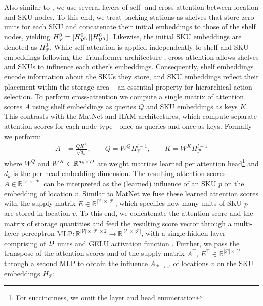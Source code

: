 Also similar to \cite{luttmann2024neural}, we use several layers of self- and cross-attention between location and SKU nodes. To this end, we treat packing stations as shelves that store zero units for each SKU and concatenate their initial embeddings to those of the shelf nodes, yielding $H^{0}_\mathcal{V} = [H^{0}_{\mathcal{V}^{\text{D}}} || H^{0}_{\mathcal{V}^{\text{R}}}]$. Likewise, the initial SKU embeddings are denoted as $H^{0}_\mathcal{P}$. While self-attention is applied independently to shelf and SKU embeddings following the Transformer architecture \cite{vaswaniAttentionAllYou2017a}, cross-attention allows shelves and SKUs to influence each other’s embeddings. Consequently, shelf embeddings encode information about the SKUs they store, and SKU embeddings reflect their placement within the storage area -- an essential property for hierarchical action selection. To perform cross-attention we compute a single matrix of attention scores $A$ using shelf embeddings as queries $Q$ and SKU embeddings as keys $K$. This contrasts with the MatNet \cite{kwonMatrixEncodingNetworks2021a} and HAM \cite{luttmann2024neural} architectures, which compute separate attention scores for each node type—once as queries and once as keys. Formally we perform:
\begin{align}
    \label{eq:matnet_dot_score}
    A &= \frac{QK^\top}{\sqrt{d_k}}, \qquad Q = W^Q H_{\mathcal{V}}^{l-1}, \qquad  K = W^K H_{\mathcal{P}}^{l-1}
\end{align}
where $W^Q$ and $W^K \in \mathbb{R}^{d_k \times {D}}$ are weight matrices learned per attention head\footnote{For succinctness, we omit the layer and head enumeration} and $d_k$ is the per-head embedding dimension. The resulting attention scores $A\in \mathbb{R}^{|\mathcal{V}| \times |\mathcal{P}|}$ can be interpreted as the (learned) influence of an SKU $p$ on the embedding of location $v$. 
Similar to MatNet \cite{kwonMatrixEncodingNetworks2021a} we fuse these learned attention scores with the supply-matrix $E \in \mathbb{R}^{|\mathcal{V}| \times |\mathcal{P}|}$, which specifies how many units of SKU $p$ are stored in location $v$. To this end, we concatenate the attention score and the matrix of storage quantities and feed the resulting score vector through a multi-layer perceptron $\text{MLP}: \mathbb{R}^{|\mathcal{V}| \times |\mathcal{P}| \times 2} \rightarrow \mathbb{R}^{|\mathcal{V}| \times |\mathcal{P}|}$, with a single hidden layer comprising of ${D}$ units and GELU activation function \cite{hendrycks2016gaussian}. Further, we pass the transpose of the attention scores and of the supply matrix $A^\top, \, E^\top \in \mathbb{R}^{|\mathcal{P}| \times |\mathcal{V}|}$ through a second MLP to obtain the influence $A_{\mathcal{P} \rightarrow \mathcal{V}}$ of locations $v$ on the SKU embeddings $H_{\mathcal{P}}$:

